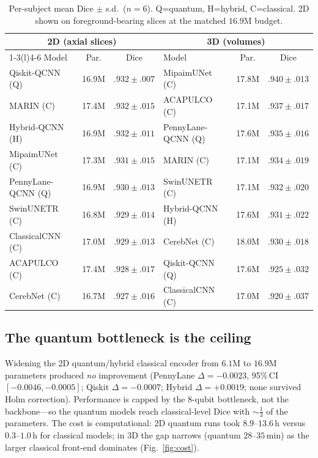 \documentclass[runningheads]{llncs}
\begin{document}
\begin{table}[t]
\centering
\caption{Per-subject mean Dice $\pm$ s.d.\ ($n{=}6$). Q=quantum, H=hybrid,
C=classical. 2D shown on foreground-bearing slices at the matched $16.9$M
budget.}
\label{tab:main}
\small
\setlength{\tabcolsep}{4pt}
\begin{tabular}{lcc@{\hskip 1em}lcc}
\toprule
\multicolumn{3}{c}{\textbf{2D (axial slices)}} &
\multicolumn{3}{c}{\textbf{3D (volumes)}}\\
\cmidrule(r){1-3}\cmidrule(l){4-6}
Model & Par. & Dice & Model & Par. & Dice\\
\midrule
Qiskit-QCNN (Q)    & 16.9M & $.932{\pm}.007$ & MipaimUNet (C)     & 17.8M & $.940{\pm}.013$\\
MARIN (C)          & 17.4M & $.932{\pm}.015$ & ACAPULCO (C)       & 17.1M & $.937{\pm}.017$\\
Hybrid-QCNN (H)    & 16.9M & $.932{\pm}.011$ & PennyLane-QCNN (Q) & 17.6M & $.935{\pm}.016$\\
MipaimUNet (C)     & 17.3M & $.931{\pm}.015$ & MARIN (C)          & 17.1M & $.934{\pm}.019$\\
PennyLane-QCNN (Q) & 16.9M & $.930{\pm}.013$ & SwinUNETR (C)      & 17.1M & $.932{\pm}.020$\\
SwinUNETR (C)      & 16.8M & $.929{\pm}.014$ & Hybrid-QCNN (H)    & 17.6M & $.931{\pm}.022$\\
ClassicalCNN (C)   & 17.0M & $.929{\pm}.013$ & CerebNet (C)       & 18.0M & $.930{\pm}.018$\\
ACAPULCO (C)       & 17.4M & $.928{\pm}.017$ & Qiskit-QCNN (Q)    & 17.6M & $.925{\pm}.032$\\
CerebNet (C)       & 16.7M & $.927{\pm}.016$ & ClassicalCNN (C)   & 17.0M & $.920{\pm}.037$\\
\bottomrule
\end{tabular}
\end{table}

\subsection{The quantum bottleneck is the ceiling}
Widening the 2D quantum/hybrid classical encoder from $6.1$M to $16.9$M
parameters produced \emph{no} improvement (PennyLane $\Delta{=}{-}0.0023$,
95\%\,CI $[-0.0046,-0.0005]$; Qiskit $\Delta{=}{-}0.0007$; Hybrid
$\Delta{=}{+}0.0019$; none survived Holm correction). Performance is capped by
the $8$-qubit bottleneck, not the backbone---so the quantum models reach
classical-level Dice with ${\sim}\tfrac13$ of the parameters. The cost is
computational: 2D quantum runs took $8.9$--$13.6$\,h versus $0.3$--$1.0$\,h for
classical models; in 3D the gap narrows (quantum $28$--$35$\,min) as the larger
classical front-end dominates (Fig.~\ref{fig:cost}).
\end{document}
